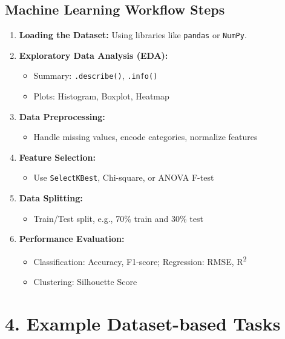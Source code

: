 \documentclass[11pt]{article}
\begin{document}
\subsection*{Machine Learning Workflow Steps}
\begin{enumerate}[label=\roman*.]
    \item \textbf{Loading the Dataset:} Using libraries like \texttt{pandas} or \texttt{NumPy}.
    \item \textbf{Exploratory Data Analysis (EDA):}
    \begin{itemize}
        \item Summary: \texttt{.describe()}, \texttt{.info()}
        \item Plots: Histogram, Boxplot, Heatmap
    \end{itemize}
    \item \textbf{Data Preprocessing:}
    \begin{itemize}
        \item Handle missing values, encode categories, normalize features
    \end{itemize}
    \item \textbf{Feature Selection:}
    \begin{itemize}
        \item Use \texttt{SelectKBest}, Chi-square, or ANOVA F-test
    \end{itemize}
    \item \textbf{Data Splitting:}
    \begin{itemize}
        \item Train/Test split, e.g., 70\% train and 30\% test
    \end{itemize}
    \item \textbf{Performance Evaluation:}
    \begin{itemize}
        \item Classification: Accuracy, F1-score; Regression: RMSE, R\textsuperscript{2}
        \item Clustering: Silhouette Score
    \end{itemize}
\end{enumerate}



\section*{4. Example Dataset-based Tasks}
\end{document}

